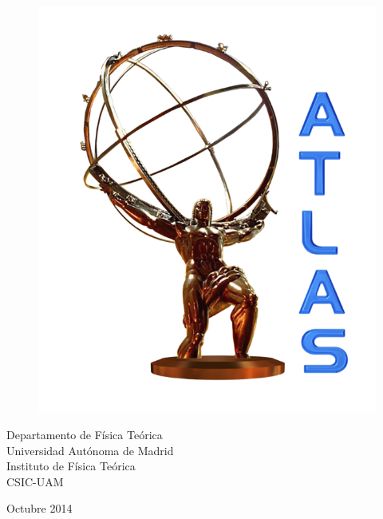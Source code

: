 \documentclass[12pt, twoside]{article}
\numberwithin{equation}{section}
\numberwithin{figure}{section}
\newenvironment{changemargin}[2]{%
\begin{list}{}{%
\setlength{\topsep}{0pt}%
\setlength{\leftmargin}{#1}%
\setlength{\rightmargin}{#2}%
\setlength{\listparindent}{\parindent}%
\setlength{\itemindent}{\parindent}%
\setlength{\parsep}{\parskip}%
}%
\item[]}{\end{list}}
\begin{document}
\begin{changemargin}{-1cm}{0cm}
\begin{figure}[ht]
                \hbox{\includegraphics[height=\ht0]{images/logo_ATLAS.png}}
            \fi
        \fi

        \noindent
        \parbox{0.2\textwidth}{%
            \centering
        }
        \hfil
        \parbox{0.2\textwidth}{%
            \centering
        }
        \hfil
        \parbox{0.2\textwidth}{%
            \centering
        }
    \end{figure}

    \vspace{0.3cm}

    \begin{center}
        {\Large {Departamento de F\'isica Te\'orica\\ Universidad Aut\'onoma de Madrid }}\\
        \vspace{0.2cm}
        {\Large {Instituto de F\'isica Te\'orica\\ \vspace{0.1cm} CSIC-UAM}}\\
    \end{center}

    \vspace{0.52cm}

    \begin{center}
        Octubre 2014
    \end{center}
\end{changemargin}
\end{document}
